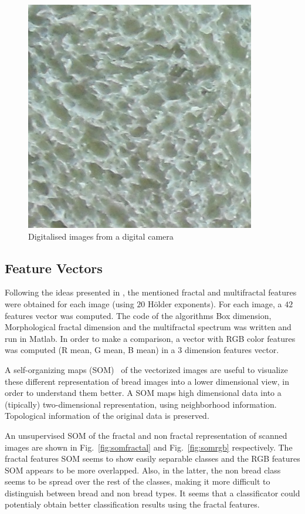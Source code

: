\documentclass[oneside,a4paper,english,links]{amca}
\begin{document}
\begin{figure}[htb]
\includegraphics[scale=0.28]{imagenes/camera/Sa14}
\caption{Digitalised images from a digital camera}
\label{fig:camera}
\end{figure}

\subsection{Feature Vectors}


Following the ideas presented in \cite{Gonzales2008}, the mentioned fractal and multifractal features were obtained for each image (using $20$ H\"older exponents). For each image, a $42$ features vector was computed. The code of the algorithms Box dimension, Morphological fractal dimension and the multifractal spectrum was written and run in Matlab. In order to make a comparison, a vector with RGB color features was computed (R mean, G mean, B mean) in a $3$ dimension features vector.

A self-organizing maps (SOM)~\cite{Kohonen2001} of the vectorized images are useful to visualize these different representation of bread images into a lower dimensional view, in order to understand them better. A SOM maps high dimensional data into a (tipically) two-dimensional representation, using neighborhood information. Topological information of the original data is preserved.  

An unsupervised SOM of the fractal and non fractal representation of scanned images are shown in Fig.~\ref{fig:somfractal} and Fig.~\ref{fig:somrgb} respectively. The fractal features SOM seems to show easily separable classes and the RGB features SOM appears to be more overlapped. Also, in the latter, the non bread class seems to be spread over the rest of the classes, making it more difficult to distinguish between bread and non bread types. It seems that a classificator could potentialy obtain better classification results using the fractal features. %
\end{document}

